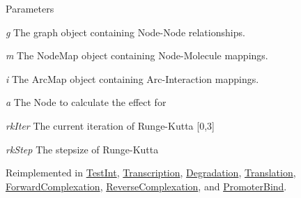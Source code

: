\begin{DoxyParams}{Parameters}
\item[{\em g}]The graph object containing Node-\/Node relationships. \item[{\em m}]The NodeMap object containing Node-\/Molecule mappings. \item[{\em i}]The ArcMap object containing Arc-\/Interaction mappings. \item[{\em a}]The Node to calculate the effect for \item[{\em rkIter}]The current iteration of Runge-\/Kutta \mbox{[}0,3\mbox{]} \item[{\em rkStep}]The stepsize of Runge-\/Kutta \end{DoxyParams}


Reimplemented in \hyperlink{classTestInt_a7e6d8e60a2ebc357052a7776244893d7}{TestInt}, \hyperlink{classTranscription_a73f9e09dac4b601a297fd4d59c92cea5}{Transcription}, \hyperlink{classDegradation_a3cad4fc84026c6f627306a7e35527f3c}{Degradation}, \hyperlink{classTranslation_a6599a0f28a58b5adf122d8b8c6206061}{Translation}, \hyperlink{classForwardComplexation_a8f7f867b98b484ed0f09192ebd280e1a}{ForwardComplexation}, \hyperlink{classReverseComplexation_a9dceec2b67efbe7c14a7e53c959263f5}{ReverseComplexation}, and \hyperlink{classPromoterBind_afadb621f9976cc52d83caec0e8613244}{PromoterBind}.

